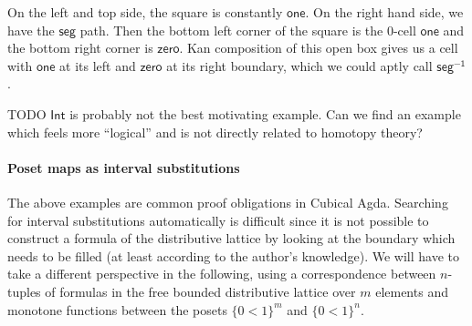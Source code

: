\documentclass{llncs}
\newcommand{\todo}[1]{
  \begin{tcolorbox}
    TODO {#1} 
  \end{tcolorbox}
}
\newcommand{\cset}[1]{\ensuremath{\mathsf{{#1}}}}
\begin{document}
On the left and top side, the square is constantly \cset{one}. On the right hand
side, we have the \cset{seg} path. Then the bottom left corner of the square is
the 0-cell \cset{one} and the bottom right corner is \cset{zero}.
Kan composition of this open box gives us a cell with \cset{one} at its
left and \cset{zero} at its right boundary, which we could aptly call \cset{seg^{-1}}.


\todo{\cset{Int} is probably not the best motivating example. Can we find an example
  which feels more ``logical'' and is not directly related to homotopy theory?}

\paragraph{Poset maps as interval substitutions}

The above examples are common proof obligations in Cubical Agda. Searching for
interval substitutions automatically is difficult since it is not possible to
construct a formula of the distributive lattice by looking at the boundary which
needs to be filled (at least according to the author's knowledge). We 
will have to take a different perspective in the following, using a
correspondence between $n$-tuples of formulas in the free bounded distributive
lattice over $m$ elements and monotone
functions between the posets  $\{ 0<1 \}^m$ and $\{ 0<1 \}^n$.

\end{document}
